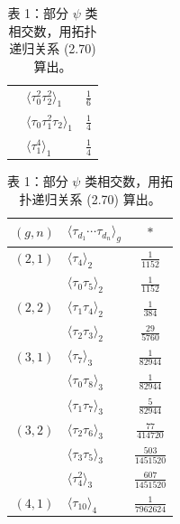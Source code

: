 \begin{exercise}[2.11]
\begin{table}[htbp]
\begin{tabular}[t]{c l c}
 & $\langle\tau_0^2\tau_2^2\rangle_1$ & $\frac{1}{6}$\\
 & $\langle\tau_0\tau_1^2\tau_2\rangle_1$ & $\frac{1}{4}$\\
 & $\langle\tau_1^4\rangle_1$ & $\frac{1}{4}$\\
\bottomrule
\end{tabular}\hspace{1.2em}%
\begin{tabular}[t]{c l c}
\toprule
$(g,n)$ & $\langle\tau_{d_1}\cdots\tau_{d_n}\rangle_g$ & $*$\\
\midrule
$(2,1)$ & $\langle\tau_4\rangle_2$ & $\frac{1}{1152}$\\
\midrule
\multirow{3}{*}{$(2,2)$} & $\langle\tau_0\tau_5\rangle_2$ & $\frac{1}{1152}$\\
 & $\langle\tau_1\tau_4\rangle_2$ & $\frac{1}{384}$\\
 & $\langle\tau_2\tau_3\rangle_2$ & $\frac{29}{5760}$\\
\midrule
$(3,1)$ & $\langle\tau_7\rangle_3$ & $\frac{1}{82944}$\\
\midrule
\multirow{5}{*}{$(3,2)$} & $\langle\tau_0\tau_8\rangle_3$ & $\frac{1}{82944}$\\
 & $\langle\tau_1\tau_7\rangle_3$ & $\frac{5}{82944}$\\
 & $\langle\tau_2\tau_6\rangle_3$ & $\frac{77}{414720}$\\
 & $\langle\tau_3\tau_5\rangle_3$ & $\frac{503}{1451520}$\\
 & $\langle\tau_4^2\rangle_3$ & $\frac{607}{1451520}$\\
\midrule
$(4,1)$ & $\langle\tau_{10}\rangle_4$ & $\frac{1}{7962624}$\\
\bottomrule
\end{tabular}
\caption*{表 1：部分 $\psi$ 类相交数，用拓扑递归关系 (2.70) 算出。}
\end{table}


\end{exercise}
